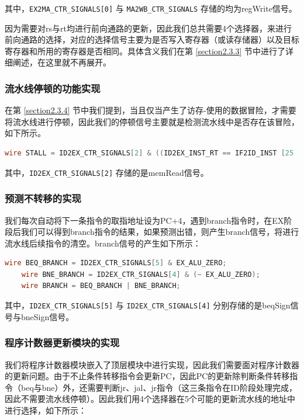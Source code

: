 \documentclass{cumcm}
\numberwithin{equation}{section}
\numberwithin{equation}{subsection}
\begin{document}
其中，\texttt{EX2MA\_CTR\_SIGNALS[0]} 与 \texttt{MA2WB\_CTR\_SIGNALS} 存储的均为regWrite信号。

因为需要对rs与rt均进行前向通路的更新，因此我们总共需要4个选择器，来进行前向通路的选择，对应的选择信号主要为是否写入寄存器（或读存储器）以及目标寄存器和所用的寄存器是否相同。具体含义我们在第 \ref{section2.3.3} 节中进行了详细阐述，在这里就不再展开。

\subsubsection{流水线停顿的功能实现}\label{section3.2.3}
在第 \ref{section2.3.4} 节中我们提到，当且仅当产生了访存-使用的数据冒险，才需要将流水线进行停顿，因此我们的停顿信号主要就是检测流水线中是否存在该冒险，如下所示。

\begin{lstlisting}[language=verilog]
    wire STALL = ID2EX_CTR_SIGNALS[2] & ((ID2EX_INST_RT == IF2ID_INST [25 : 21]) | (ID2EX_INST_RT == IF2ID_INST [20 : 16]));
\end{lstlisting}

其中，\texttt{ID2EX\_CTR\_SIGNALS[2]} 存储的是memRead信号。

\subsubsection{预测不转移的实现}\label{section3.2.4}
我们每次自动将下一条指令的取指地址设为PC+4，遇到branch指令时，在EX阶段后我们可以得到branch指令的结果，如果预测出错，则产生branch信号，将进行流水线后续指令的清空。branch信号的产生如下所示：

\begin{lstlisting}[language=verilog]
    wire BEQ_BRANCH = ID2EX_CTR_SIGNALS[5] & EX_ALU_ZERO;    
    wire BNE_BRANCH = ID2EX_CTR_SIGNALS[4] & (~ EX_ALU_ZERO);
    wire BRANCH = BEQ_BRANCH | BNE_BRANCH;
\end{lstlisting}

其中，\texttt{ID2EX\_CTR\_SIGNALS[5]} 与 \texttt{ID2EX\_CTR\_SIGNALS[4]} 分别存储的是beqSign信号与bneSign信号。

\subsubsection{程序计数器更新模块的实现}\label{section3.2.5}

我们将程序计数器模块嵌入了顶层模块中进行实现，因此我们需要面对程序计数器的更新问题。由于不止条件转移指令会更新PC，因此PC的更新除判断条件转移指令（beq与bne）外，还需要判断jr、jal、jr指令（这三条指令在ID阶段处理完成，因此不需要流水线停顿）。因此我们用4个选择器在5个可能的更新流水线的地址中进行选择，如下所示：
\end{document}
